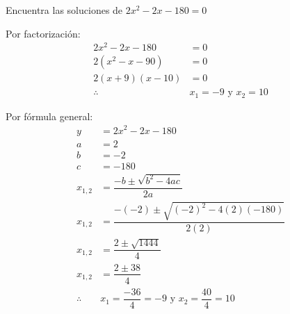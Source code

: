 Encuentra las soluciones de $2x^2-2x-180=0$

\begin{solutionbox}{12cm}
    \begin{multicols}{2}
        Por factorización:
        \begin{align*}
            2x^2-2x-180  & = 0                        \\
            2(x^2-x-90)  & = 0                        \\
            2(x+9)(x-10) & = 0                        \\
            \therefore   & x_1 =-9 \text{ y } x_2 =10
        \end{align*}

        \columnbreak

        Por fórmula general:
        \begin{align*}
            y          & =	    2x^2-2x-180
            \\
            a          & =2
            \\
            b          & =-2
            \\
            c          & =-180
            \\
            x_{1,2}    & = \dfrac{-b\pm\sqrt{b^2-4ac}}{2a}
            \\[2em]
            x_{1,2}    & = \dfrac{-(-2)\pm\sqrt{(-2)^2-4(2)(-180)}}{2(2)}
            \\[2em]
            x_{1,2}    & = \dfrac{2\pm\sqrt{1444}}{4}
            \\[2em]
            x_{1,2}    & = \dfrac{2\pm 38}{4}
            \\[2em]
            \therefore & x_1 =\dfrac{-36}{4}=-9 \text{ y }  x_2
            =\dfrac{40}{4}=10                                             \\[2em]
        \end{align*}
    \end{multicols}
\end{solutionbox}
